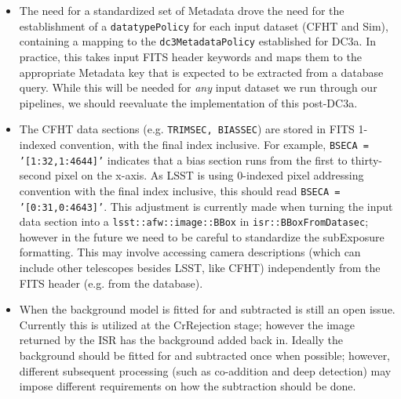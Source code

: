 \begin{itemize}

\item The need for a standardized set of Metadata drove the need for the 
establishment of a {\tt datatypePolicy} for each input dataset (CFHT
and Sim), containing a mapping to the {\tt dc3MetadataPolicy}
established for DC3a.  In practice, this takes input FITS header
keywords and maps them to the appropriate Metadata key that is
expected to be extracted from a database query.  While this will be
needed for {\it any} input dataset we run through our pipelines, we
should reevaluate the implementation of this post-DC3a.

\item The CFHT data sections (e.g. {\tt TRIMSEC, BIASSEC}) are stored
in FITS 1-indexed convention, with the final index inclusive.  For
example, {\tt BSECA = '[1:32,1:4644]'} indicates that a bias section
runs from the first to thirty-second pixel on the x-axis.  As LSST is
using 0-indexed pixel addressing convention with the final index
inclusive, this should read {\tt BSECA = '[0:31,0:4643]'}.  This
adjustment is currently made when turning the input data section into
a {\tt lsst::afw::image::BBox} in {\tt isr::BBoxFromDatasec}; however
in the future we need to be careful to standardize the subExposure
formatting.  This may involve accessing camera descriptions (which can
include other telescopes besides LSST, like CFHT) independently from
the FITS header (e.g. from the database).  

\item When the background model is fitted for and 
subtracted is still an open issue.  Currently this is utilized at the
CrRejection stage; however the image returned by the ISR has the
background added back in.  Ideally the background should be fitted for
and subtracted once when possible; however, different subsequent
processing (such as co-addition and deep detection) may impose
different requirements on how the subtraction should be done. 


\end{itemize}
